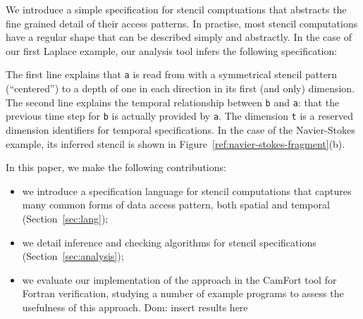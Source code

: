 \documentclass[9pt]{sigplanconf}
\newcommand{\dnote}[1]{\textcolor{darkpurple}{Dom: #1}}
\theoremstyle{definition}
\begin{document}
We introduce a simple specification for stencil comptuations
that abstracts the fine grained detail of their access patterns.
In practise, most stencil computations have a regular shape that
can be described simply and abstractly. In the case of our
first Laplace example, our analysis tool infers the following specification:
%
\begin{SpecVerbatim}
\end{SpecVerbatim}
%
The first line explains that \texttt{a} is read from
with a symmetrical stencil pattern (``centered'') to a depth
of one in each direction in its first (and only) dimension.
The second line explains the temporal relationship between
\texttt{b} and \texttt{a}: that the previous time step for \texttt{b}
is actually provided by \texttt{a}. The dimension \texttt{t} is a
reserved dimension identifiers for temporal specifications. In
the case of the Navier-Stokes example, its inferred stencil is shown
in Figure~\ref{ref:navier-stokes-fragment}(b).

In this paper, we make the following contributions:
%
\begin{itemize}
\item we introduce a specification language for
stencil computations that captures many common forms
of data access pattern, both spatial and temporal (Section~\ref{sec:lang});
\item we detail inference and checking
algorithms for stencil specifications (Section~\ref{sec:analysis});
\item we evaluate our implementation of the approach
in the CamFort tool for Fortran verification, studying
a number of example programs to assess the usefulness
of this approach.
\dnote{insert results here}
\end{itemize}
%
\end{document}
